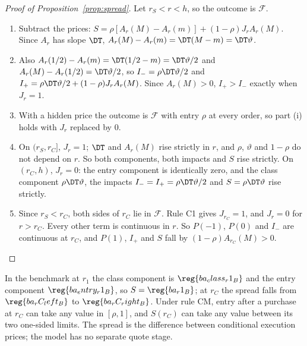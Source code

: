 \begin{proof}[Proof of Proposition~\ref{prop:spread}]
Let \(r_S<r<h\), so the outcome is \(\mathcal F\).
\begin{enumerate}[label=(\roman*),leftmargin=2em]
\item Subtract the prices: \(S=\rho[A_r(M)-A_r(m)]+(1-\rho)J_rA_r(M)\). Since \(A_r\) has slope \(\DT\),
\(A_r(M)-A_r(m)=\DT(M-m)=\DT\vartheta\).
\item Also \(A_r(1/2)-A_r(m)=\DT(1/2-m)=\DT\vartheta/2\) and \(A_r(M)-A_r(1/2)=\DT\vartheta/2\), so
\(I_-=\rho\DT\vartheta/2\) and \(I_+=\rho\DT\vartheta/2+(1-\rho)J_rA_r(M)\). Since \(A_r(M)>0\), \(I_+>I_-\) exactly when
\(J_r=1\).
\item With a hidden price the outcome is \(\mathcal F\) with entry \(\rho\) at every order, so part (i) holds with
\(J_r\) replaced by \(0\).
\item On \((r_S,r_C]\), \(J_r=1\); \(\DT\) and \(A_r(M)\) rise strictly in \(r\), and \(\rho\), \(\vartheta\) and
\(1-\rho\) do not depend on \(r\). So both components, both impacts and \(S\) rise strictly. On \((r_C,h)\), \(J_r=0\):
the entry component is identically zero, and the class component \(\rho\DT\vartheta\), the impacts
\(I_-=I_+=\rho\DT\vartheta/2\) and \(S=\rho\DT\vartheta\) rise strictly.
\item Since \(r_S<r_C\), both sides of \(r_C\) lie in \(\mathcal F\). Rule C1 gives \(J_{r_C}=1\), and \(J_r=0\) for
\(r>r_C\). Every other term is continuous in \(r\). So \(P(-1)\), \(P(0)\) and \(I_-\) are continuous at \(r_C\), and
\(P(1)\), \(I_+\) and \(S\) fall by \((1-\rho)A_{r_C}(M)>0\).\qedhere
\end{enumerate}
\end{proof}
In the benchmark at \(r_1\) the class component is \(\reg{ba_class_r1_B}\) and the entry component \(\reg{ba_entry_r1_B}\),
so \(S=\reg{ba_r1_B}\); at \(r_C\) the spread falls from \(\reg{ba_rC_left_B}\) to \(\reg{ba_rC_right_B}\). Under rule CM,
entry after a purchase at \(r_C\) can take any value in \([\rho,1]\), and \(S(r_C)\) can take any value between its
two one-sided limits. The spread is the difference between conditional execution prices; the model has no
separate quote stage.

